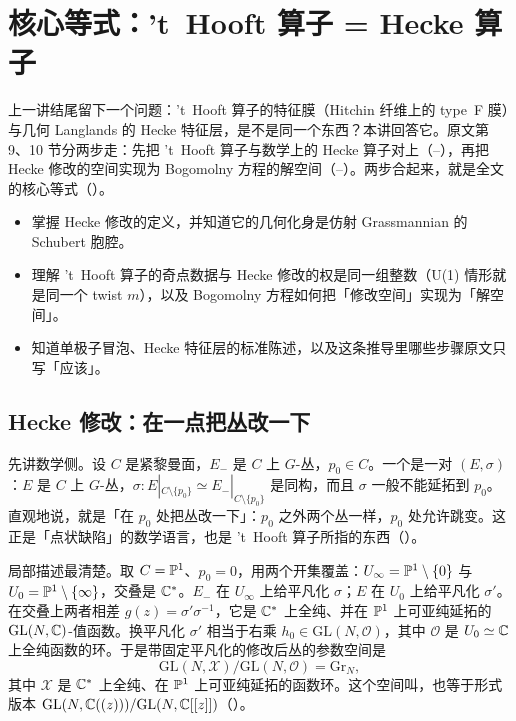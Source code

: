 
\section{核心等式：'t~Hooft 算子 = Hecke 算子}
\label{sec:hecke}

上一讲结尾留下一个问题：'t~Hooft 算子的特征膜（Hitchin 纤维上的 type~F 膜）与几何 Langlands 的 Hecke 特征层，是不是同一个东西？本讲回答它。原文第 9、10 节分两步走：先把 't~Hooft 算子与数学上的 Hecke 算子对上（--），再把 Hecke 修改的空间实现为 Bogomolny 方程的解空间（--）。两步合起来，就是全文的核心等式（\cite{kw06}）。

\begin{goals}
\begin{itemize}
\item 掌握 Hecke 修改的定义，并知道它的几何化身是仿射 Grassmannian 的 Schubert 胞腔。
\item 理解 't~Hooft 算子的奇点数据与 Hecke 修改的权是同一组整数（U(1) 情形就是同一个 twist $m$），以及 Bogomolny 方程如何把「修改空间」实现为「解空间」。
\item 知道单极子冒泡、Hecke 特征层的标准陈述，以及这条推导里哪些步骤原文只写「应该」。
\end{itemize}
\end{goals}

\subsection{Hecke 修改：在一点把丛改一下}

先讲数学侧。设 $C$ 是紧黎曼面，$E_-$ 是 $C$ 上 $G$-丛，$p_0\in C$。一个是一对 $(E,\sigma)$：$E$ 是 $C$ 上 $G$-丛，$\sigma:E|_{C\setminus\{p_0\}}\simeq E_-|_{C\setminus\{p_0\}}$ 是同构，而且 $\sigma$ 一般不能延拓到 $p_0$。直观地说，就是「在 $p_0$ 处把丛改一下」：$p_0$ 之外两个丛一样，$p_0$ 处允许跳变。这正是「点状缺陷」的数学语言，也是 't~Hooft 算子所指的东西（）。

局部描述最清楚。取 $C=\mathbb{P}^1$、$p_0=0$，用两个开集覆盖：$U_\infty=\mathbb{P}^1\setminus\{0\}$ 与 $U_0=\mathbb{P}^1\setminus\{\infty\}$，交叠是 $\mathbb{C}^*$。$E_-$ 在 $U_\infty$ 上给平凡化 $\sigma$；$E$ 在 $U_0$ 上给平凡化 $\sigma'$。在交叠上两者相差 $g(z)=\sigma'\sigma^{-1}$，它是 $\mathbb{C}^*$ 上全纯、并在 $\mathbb{P}^1$ 上可亚纯延拓的 $\mathrm{GL}(N,\mathbb{C})$-值函数。换平凡化 $\sigma'$ 相当于右乘 $h_0\in\mathrm{GL}(N,\mathcal O)$，其中 $\mathcal O$ 是 $U_0\simeq\mathbb{C}$ 上全纯函数的环。于是带固定平凡化的修改后丛的参数空间是
\begin{equation}
\mathrm{GL}(N,\mathcal X)/\mathrm{GL}(N,\mathcal O)=\mathrm{Gr}_N,
\label{eq:grn}
\end{equation}
其中 $\mathcal X$ 是 $\mathbb{C}^*$ 上全纯、在 $\mathbb{P}^1$ 上可亚纯延拓的函数环。这个空间叫，也等于形式版本 $\mathrm{GL}(N,\mathbb{C}((z)))/\mathrm{GL}(N,\mathbb{C}[[z]])$（）。


